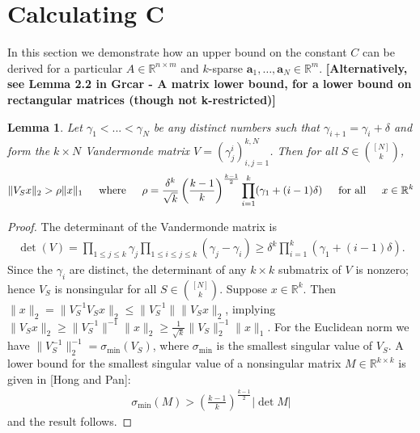 \documentclass[journal, onecolumn]{IEEEtran}
\newtheorem{lemma}{Lemma}
\begin{document}

\section{Calculating C}

In this section we demonstrate how an upper bound on the constant $C$ can be derived for a particular $A \in \mathbb{R}^{n \times m}$ and $k$-sparse $\mathbf{a}_1, \ldots, \mathbf{a}_N \in \mathbb{R}^m$. \textbf{[Alternatively, see Lemma 2.2 in Grcar - A matrix lower bound, for a lower bound on rectangular matrices (though not k-restricted)]}


\begin{lemma}\label{MatrixLowerBoundLemma}
Let $\gamma_1 < ... < \gamma_N$ be any distinct numbers such that $\gamma_{i+1} = \gamma_i + \delta$ and form the $k \times N$ Vandermonde matrix $V = (\gamma^i_j)^{k,N}_{i,j=1}$. Then for all $S \in {[N] \choose k}$, 
\begin{align}
	\|V_S x\|_2 > \rho \|x\|_1 \indent \text{where} \indent \rho = \frac{\delta^k}{\sqrt{k}} \left( \frac{k-1}{k} \right)^\frac{k-1}{2} \prod_{i = 1}^k (\gamma_1 + (i-1)\delta) \indent \text{for all} \indent x \in \mathbb{R}^k
\end{align}
\end{lemma}

\begin{proof} 
The determinant of the Vandermonde matrix is
\begin{align}
	\det(V) = \prod_{1 \leq j \leq k} \gamma_j \prod_{1 \leq i \leq j \leq k} (\gamma_j - \gamma_i) \geq \delta^k \prod_{i = 1}^k (\gamma_1 + (i-1)\delta).
\end{align}	
Since the $\gamma_i$ are distinct, the determinant of any $k \times k$ submatrix of $V$ is nonzero; hence $V_S$ is nonsingular for all $S \in {[N] \choose k}$. Suppose $x \in \mathbb{R}^k$. Then $\|x\|_2 = \|V_S^{-1} V_S x\|_2 \leq \|V_S^{-1}\| \|V_S x\|_2$, implying $\|V_Sx\|_2 \geq \|V_S^{-1}\|^{-1}\|x\|_2 \geq \frac{1}{\sqrt{k}} \|V_S\|_2^{-1}\|x\|_1$. For the Euclidean norm we have $\|V_S^{-1}\|_2^{-1} = \sigma_{\min}(V_S)$, where $\sigma_{\min}$ is the smallest singular value of $V_S$. A lower bound for the smallest singular value of a nonsingular matrix $M \in \mathbb{R}^{k \times k}$ is given in [Hong and Pan]:
\begin{align}
	\sigma_{\min}(M) > \left( \frac{k-1}{k} \right)^\frac{k-1}{2} |\det M|
\end{align}
%
and the result follows. 
\end{proof}
\end{document}
